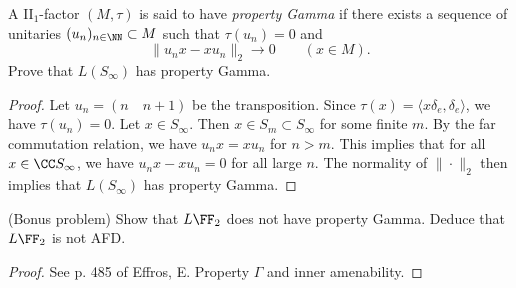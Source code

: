 \documentclass{article}
\begin{document}
 A II$_1$-factor $(M, \tau)$ is said to have \emph{property Gamma} if there exists a sequence of unitaries $(u_n)_{n \in \NN} \subset M$ such that $\tau(u_n) = 0$ and
$$ \| u_nx - xu_n \|_2 \to 0 \qquad (x \in M).$$
Prove that $L(S_\infty)$ has property Gamma.
\begin{proof}
  Let $u_n = (n \quad n+1)$ be the transposition. Since $\tau(x) = \langle x \delta_e, \delta_e \rangle$, we have $\tau(u_n) = 0$.  Let $x \in S_\infty$.  Then $x \in S_m \subset S_\infty$ for some finite $m$.  By the far commutation relation, we have $u_n x = x u_n$ for $n > m$.  This implies that for all $x \in \CC S_\infty$, we have $u_n x - x u_n = 0$ for all large $n$.  The normality of $\| \cdot \|_2$ then implies that $L(S_\infty)$ has property Gamma.  
\end{proof}

 (Bonus problem) Show that $L\FF_2$ does not have property Gamma. Deduce that $L \FF_2$ is not AFD.
\begin{proof}
  See p. 485 of Effros, E. Property $\Gamma$ and inner amenability.
\end{proof}
\end{document}
